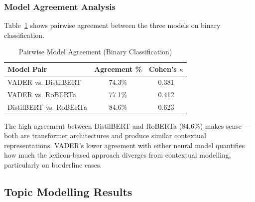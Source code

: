 \subsubsection{Model Agreement Analysis}
\begin{justify}
Table~\ref{tab:agreement} shows pairwise agreement between the three models on binary classification.

\begin{table}[H]
\centering
\caption{Pairwise Model Agreement (Binary Classification)}
\renewcommand{\arraystretch}{1.3}
\begin{tabular}{|l|c|c|}
\hline
\textbf{Model Pair} & \textbf{Agreement \%} & \textbf{Cohen's $\kappa$} \\
\hline
VADER vs. DistilBERT & 74.3\% & 0.381 \\
\hline
VADER vs. RoBERTa & 77.1\% & 0.412 \\
\hline
DistilBERT vs. RoBERTa & 84.6\% & 0.623 \\
\hline
\end{tabular}
\label{tab:agreement}
\end{table}

The high agreement between DistilBERT and RoBERTa (84.6\%) makes sense — both are transformer architectures and produce similar contextual representations. VADER's lower agreement with either neural model quantifies how much the lexicon-based approach diverges from contextual modelling, particularly on borderline cases.
\end{justify}

\subsection{Topic Modelling Results}
\label{sec:topic_results}

